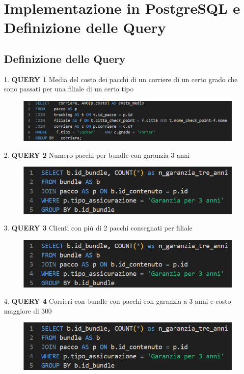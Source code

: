 \section{Implementazione in PostgreSQL e Definizione
delle Query}

\subsection{Definizione delle Query}

1. \textbf{QUERY 1} Media del costo dei pacchi di un corriere di un certo grado che sono passati per una filiale di un certo tipo
  \begin{figure}[H]
\centering
\includegraphics[width=1 \textwidth]{Resources/QUERY1.png}
\label{ML}
\end{figure}
2. \textbf{QUERY 2} Numero pacchi per bundle con garanzia 3 anni
\begin{figure}[H]
\centering
\includegraphics[width=1 \textwidth]{Resources/QUERY2.png}
\label{ML}
\end{figure}
3. \textbf{QUERY 3} Clienti con più di 2 pacchi consegnati per filiale
\begin{figure}[H]
\centering
\includegraphics[width=1 \textwidth]{Resources/QUERY2.png}
\label{ML}
\end{figure}
4. \textbf{QUERY 4} Corrieri con bundle con pacchi con garanzia a 3 anni e costo maggiore di 300
\begin{figure}[H]
\centering
\includegraphics[width=1 \textwidth]{Resources/QUERY2.png}
\label{ML}
\end{figure} 
